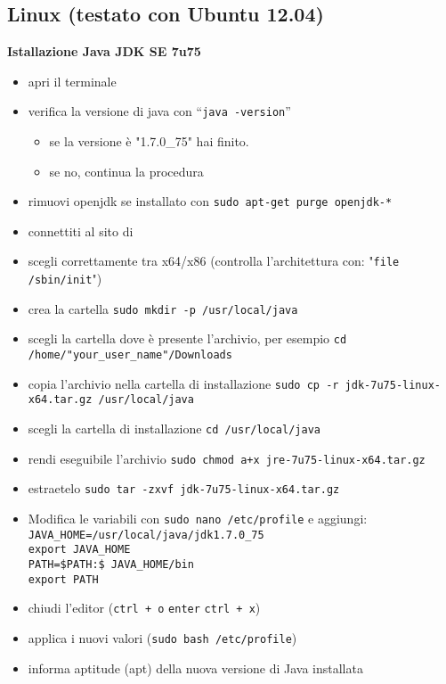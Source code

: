 \documentclass{article}
\begin{document}
\subsection{Linux (testato con Ubuntu 12.04)}
\textbf{Istallazione Java JDK SE 7u75}
\begin{itemize}
\item apri il terminale
\item  verifica la versione di java con ``\texttt{java -version}''
\begin{itemize}
\item se la versione \`e "1.7.0\_75" hai finito.
\item se no, continua la procedura
\end{itemize}
\item rimuovi openjdk se installato con \texttt{sudo apt-get purge openjdk-*}
\item connettiti al sito di
  \href{http://www.oracle.com/technetwork/java/javase/downloads/jdk7-downloads-1880260.html}{}
\item scegli correttamente tra x64/x86 (controlla l'architettura con:  "\texttt{file /sbin/init}")
\item crea la cartella \texttt{sudo mkdir -p /usr/local/java}
\item scegli la cartella dove \`e presente l'archivio, per esempio \texttt{cd /home/"your\_user\_name"/Downloads}
\item copia l'archivio nella cartella di installazione	\texttt{sudo cp -r jdk-7u75-linux-x64.tar.gz /usr/local/java}
\item scegli la cartella di installazione \texttt{cd /usr/local/java}
\item rendi eseguibile l'archivio \texttt{sudo chmod a+x jre-7u75-linux-x64.tar.gz}%
\item estraetelo \texttt{sudo tar -zxvf jdk-7u75-linux-x64.tar.gz}
\item Modifica le variabili con \texttt{sudo nano /etc/profile}  e
  aggiungi: \\
\texttt{JAVA\_HOME=/usr/local/java/jdk1.7.0\_75} \\
\texttt{export JAVA\_HOME}\\
\texttt{PATH=\$PATH:\$ JAVA\_HOME/bin}\\
\texttt{export PATH}
\item chiudi l'editor (\texttt{ctrl + o} \texttt{enter} \texttt{ctrl + x})
\item applica i nuovi valori (\texttt{sudo bash /etc/profile})
\item informa aptitude (apt) della nuova versione di Java installata

\end{itemize}
\end{document}
